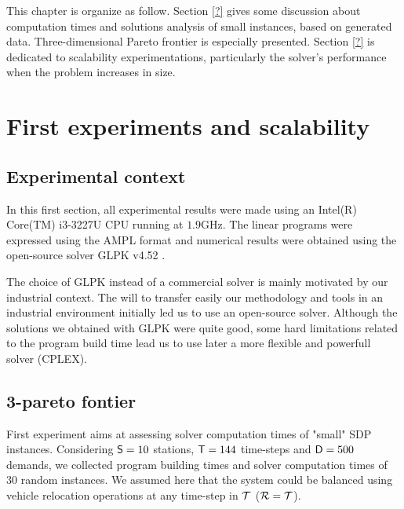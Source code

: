 \begin{bibunit}[ieeetr]
This chapter is organize as follow.
Section \ref{?} gives some discussion about computation times and solutions analysis of small instances, based on generated data.
Three-dimensional Pareto frontier is especially presented.
Section \ref{?} is dedicated to scalability experimentations, particularly the solver's performance when the problem increases in size.



\section{First experiments and scalability}
\subsection{Experimental context}

In this first section, all experimental results were made using an Intel(R) Core(TM) i3-3227U CPU running at $1.9$GHz. The linear programs were expressed using the AMPL format \cite{ampl_webPage} and numerical results were obtained using the open-source solver GLPK v4.52 \cite{glpk_webPage}.

The choice of GLPK instead of a commercial solver is mainly motivated by our industrial context.
The will to transfer easily our methodology and tools in an industrial environment initially led us to use an open-source solver.
Although the solutions we obtained with GLPK were quite good, some hard limitations related to the program build time lead us to use later a more flexible and powerfull solver (CPLEX).


\subsection{3-pareto fontier}
First experiment aims at assessing solver computation times of "small" SDP instances.
Considering $\mathsf{S} = 10$ stations, $\mathsf{T} = 144$ time-steps and $\mathsf{D} = 500$ demands, we collected program building times and solver computation times of $30$ random instances.
We assumed here that the system could be balanced using vehicle relocation operations at any time-step in $\mathcal{T}$ (\ie $\mathcal{R} = \mathcal{T}$).


\end{bibunit}

